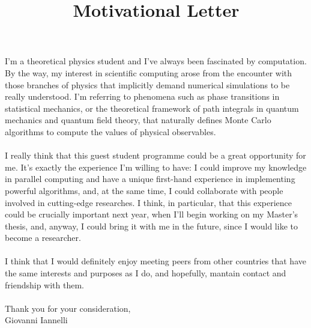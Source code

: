 \documentclass{article}
\title{Motivational Letter}
\date{}
\begin{document}
\maketitle

I'm a theoretical physics student and I've always been fascinated by computation. By the way, my interest in scientific computing arose from the encounter with those branches of physics that implicitly demand numerical simulations to be really understood. I'm referring to phenomena such as phase transitions in statistical mechanics, or the theoretical framework of path integrals in quantum mechanics and quantum field theory, that naturally defines Monte Carlo algorithms to compute the values of physical observables.\\ \\
I really think that this guest student programme could be a great opportunity for me. It's exactly the experience I'm willing to have: I could improve my knowledge in parallel computing and have a unique first-hand experience in implementing powerful algorithms, and, at the same time, I could collaborate with people involved in cutting-edge researches. I think, in particular, that this experience could be crucially important next year, when I'll begin working on my Master's thesis, and, anyway, I could bring it with me in the future, since I would like to become a researcher.\\ \\
I think that I would definitely enjoy meeting peers from other countries that have the same interests and purposes as I do, and hopefully, mantain contact and friendship with them.\\ \\
Thank you for your consideration,\\
Giovanni Iannelli
\end{document}
